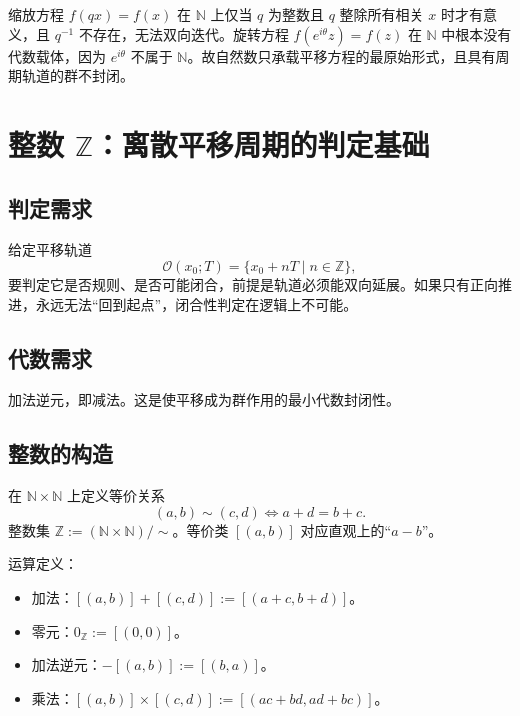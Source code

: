 \begin{remark}[自然数中缩放方程与旋转方程的地位]\label{rem:scaling_rotation_N}
缩放方程 $f(qx)=f(x)$ 在 $\mathbb{N}$ 上仅当 $q$ 为整数且 $q$ 整除所有相关 $x$ 时才有意义，且 $q^{-1}$ 不存在，无法双向迭代。旋转方程 $f(e^{i\theta}z)=f(z)$ 在 $\mathbb{N}$ 中根本没有代数载体，因为 $e^{i\theta}$ 不属于 $\mathbb{N}$。故自然数只承载平移方程的最原始形式，且具有周期轨道的群不封闭。
\end{remark}

\section{\texorpdfstring{整数 $\mathbb{Z}$：离散平移周期的判定基础}{整数 Z：离散平移周期的判定基础}}

\subsection{\texorpdfstring{判定需求}{判定需求}}

给定平移轨道
\[
\mathcal{O}(x_0; T) = \{x_0 + nT \mid n \in \mathbb{Z}\},
\]
要判定它是否规则、是否可能闭合，前提是轨道必须能双向延展。如果只有正向推进，永远无法“回到起点”，闭合性判定在逻辑上不可能。

\subsection{\texorpdfstring{代数需求}{代数需求}}

加法逆元，即减法。这是使平移成为群作用的最小代数封闭性。

\subsection{\texorpdfstring{整数的构造}{整数的构造}}

\begin{definition}[整数的构造]\label{def:integer_construction}
在 $\mathbb{N} \times \mathbb{N}$ 上定义等价关系
\[
(a,b) \sim (c,d) \iff a + d = b + c.
\]
整数集 $\mathbb{Z} := (\mathbb{N} \times \mathbb{N}) / \sim$。等价类 $[(a,b)]$ 对应直观上的“$a - b$”。

运算定义：
\begin{itemize}
    \item 加法：$[(a,b)] + [(c,d)] := [(a+c, b+d)]$。
    \item 零元：$0_{\mathbb{Z}} := [(0,0)]$。
    \item 加法逆元：$-[(a,b)] := [(b,a)]$。
    \item 乘法：$[(a,b)] \times [(c,d)] := [(ac+bd, ad+bc)]$。
\end{itemize}
\end{definition}


